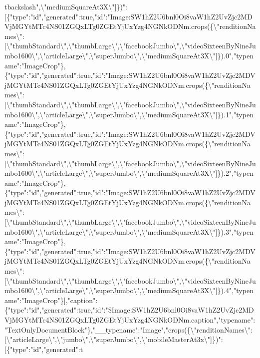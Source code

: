 tbackslash{}",\textbackslash{}"mediumSquareAt3X\textbackslash{}"{]}\})":{[}\{"type":"id","generated":true,"id":"Image:SW1hZ2U6bnl0Oi8vaW1hZ2UvZjc2MDVjMGYtMTc4NS01ZGQxLTg0ZGEtYjUxYzg4NGNkODNm.crops(\{\textbackslash{}"renditionNames\textbackslash{}":{[}\textbackslash{}"thumbStandard\textbackslash{}",\textbackslash{}"thumbLarge\textbackslash{}",\textbackslash{}"facebookJumbo\textbackslash{}",\textbackslash{}"videoSixteenByNineJumbo1600\textbackslash{}",\textbackslash{}"articleLarge\textbackslash{}",\textbackslash{}"superJumbo\textbackslash{}",\textbackslash{}"mediumSquareAt3X\textbackslash{}"{]}\}).0","typename":"ImageCrop"\},\{"type":"id","generated":true,"id":"Image:SW1hZ2U6bnl0Oi8vaW1hZ2UvZjc2MDVjMGYtMTc4NS01ZGQxLTg0ZGEtYjUxYzg4NGNkODNm.crops(\{\textbackslash{}"renditionNames\textbackslash{}":{[}\textbackslash{}"thumbStandard\textbackslash{}",\textbackslash{}"thumbLarge\textbackslash{}",\textbackslash{}"facebookJumbo\textbackslash{}",\textbackslash{}"videoSixteenByNineJumbo1600\textbackslash{}",\textbackslash{}"articleLarge\textbackslash{}",\textbackslash{}"superJumbo\textbackslash{}",\textbackslash{}"mediumSquareAt3X\textbackslash{}"{]}\}).1","typename":"ImageCrop"\},\{"type":"id","generated":true,"id":"Image:SW1hZ2U6bnl0Oi8vaW1hZ2UvZjc2MDVjMGYtMTc4NS01ZGQxLTg0ZGEtYjUxYzg4NGNkODNm.crops(\{\textbackslash{}"renditionNames\textbackslash{}":{[}\textbackslash{}"thumbStandard\textbackslash{}",\textbackslash{}"thumbLarge\textbackslash{}",\textbackslash{}"facebookJumbo\textbackslash{}",\textbackslash{}"videoSixteenByNineJumbo1600\textbackslash{}",\textbackslash{}"articleLarge\textbackslash{}",\textbackslash{}"superJumbo\textbackslash{}",\textbackslash{}"mediumSquareAt3X\textbackslash{}"{]}\}).2","typename":"ImageCrop"\},\{"type":"id","generated":true,"id":"Image:SW1hZ2U6bnl0Oi8vaW1hZ2UvZjc2MDVjMGYtMTc4NS01ZGQxLTg0ZGEtYjUxYzg4NGNkODNm.crops(\{\textbackslash{}"renditionNames\textbackslash{}":{[}\textbackslash{}"thumbStandard\textbackslash{}",\textbackslash{}"thumbLarge\textbackslash{}",\textbackslash{}"facebookJumbo\textbackslash{}",\textbackslash{}"videoSixteenByNineJumbo1600\textbackslash{}",\textbackslash{}"articleLarge\textbackslash{}",\textbackslash{}"superJumbo\textbackslash{}",\textbackslash{}"mediumSquareAt3X\textbackslash{}"{]}\}).3","typename":"ImageCrop"\},\{"type":"id","generated":true,"id":"Image:SW1hZ2U6bnl0Oi8vaW1hZ2UvZjc2MDVjMGYtMTc4NS01ZGQxLTg0ZGEtYjUxYzg4NGNkODNm.crops(\{\textbackslash{}"renditionNames\textbackslash{}":{[}\textbackslash{}"thumbStandard\textbackslash{}",\textbackslash{}"thumbLarge\textbackslash{}",\textbackslash{}"facebookJumbo\textbackslash{}",\textbackslash{}"videoSixteenByNineJumbo1600\textbackslash{}",\textbackslash{}"articleLarge\textbackslash{}",\textbackslash{}"superJumbo\textbackslash{}",\textbackslash{}"mediumSquareAt3X\textbackslash{}"{]}\}).4","typename":"ImageCrop"\}{]},"caption":\{"type":"id","generated":true,"id":"\$Image:SW1hZ2U6bnl0Oi8vaW1hZ2UvZjc2MDVjMGYtMTc4NS01ZGQxLTg0ZGEtYjUxYzg4NGNkODNm.caption","typename":"TextOnlyDocumentBlock"\},"\_\_typename":"Image","crops(\{\textbackslash{}"renditionNames\textbackslash{}":{[}\textbackslash{}"articleLarge\textbackslash{}",\textbackslash{}"jumbo\textbackslash{}",\textbackslash{}"superJumbo\textbackslash{}",\textbackslash{}"mobileMasterAt3x\textbackslash{}"{]}\})":{[}\{"type":"id","generated":t